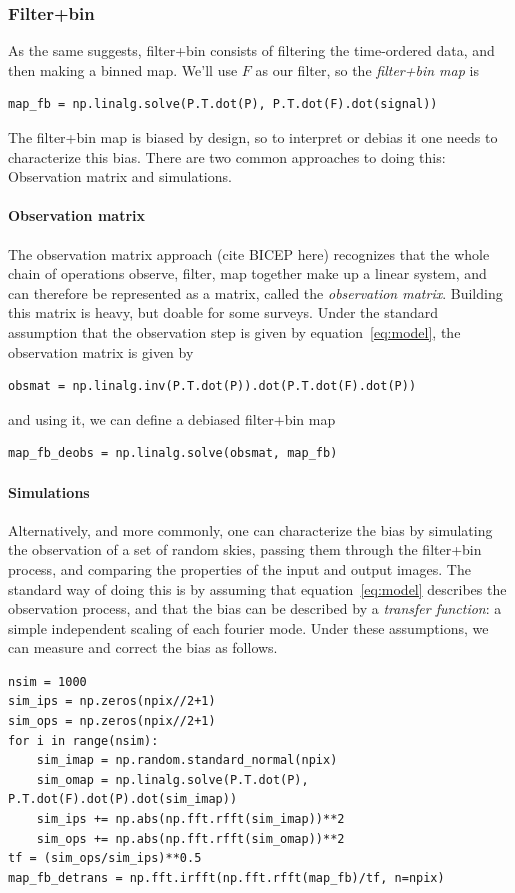 \documentclass[twocolumn,apj]{aastex63}
\begin{document}
\subsubsection{Filter+bin}
As the same suggests, filter+bin consists of filtering the time-ordered
data, and then making a binned map. We'll use $F$ as our filter, so
the \emph{filter+bin map} is
\begin{lstlisting}
map_fb = np.linalg.solve(P.T.dot(P), P.T.dot(F).dot(signal))
\end{lstlisting}
The filter+bin map is biased by design, so to interpret or debias it one
needs to characterize this bias. There are two common approaches
to doing this: Observation matrix and simulations.

\paragraph{Observation matrix}
The observation matrix approach (cite BICEP here)
recognizes that the whole chain of operations observe, filter, map
together make up a linear system, and can therefore be represented
as a matrix, called the \emph{observation matrix}. Building this matrix is heavy, but doable for some
surveys. Under the standard assumption that the observation step is
given by equation~\ref{eq:model}, the observation matrix is given by
\begin{lstlisting}
obsmat = np.linalg.inv(P.T.dot(P)).dot(P.T.dot(F).dot(P))
\end{lstlisting}
and using it, we can define a debiased filter+bin map
\begin{lstlisting}
map_fb_deobs = np.linalg.solve(obsmat, map_fb)
\end{lstlisting}

\paragraph{Simulations}
Alternatively, and more commonly, one can characterize the bias
by simulating the observation of a set of random skies, passing
them through the filter+bin process, and comparing the properties
of the input and output images. The standard way of doing this is
by assuming that equation~\ref{eq:model} describes the observation
process, and that the bias can be described by a \emph{transfer function}:
a simple independent scaling of each fourier mode. Under
these assumptions, we can measure and correct the bias as follows.
\begin{lstlisting}
nsim = 1000
sim_ips = np.zeros(npix//2+1)
sim_ops = np.zeros(npix//2+1)
for i in range(nsim):
	sim_imap = np.random.standard_normal(npix)
	sim_omap = np.linalg.solve(P.T.dot(P), P.T.dot(F).dot(P).dot(sim_imap))
	sim_ips += np.abs(np.fft.rfft(sim_imap))**2
	sim_ops += np.abs(np.fft.rfft(sim_omap))**2
tf = (sim_ops/sim_ips)**0.5
map_fb_detrans = np.fft.irfft(np.fft.rfft(map_fb)/tf, n=npix)
\end{lstlisting}
\end{document}
